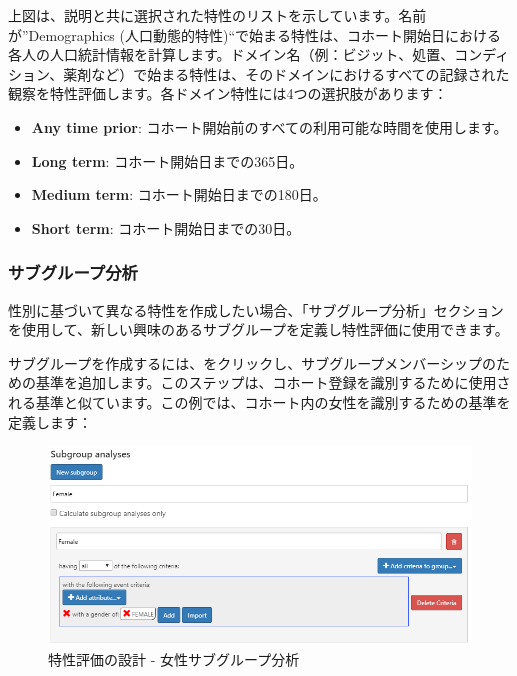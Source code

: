 \documentclass[
  11pt]{book}
\providecommand{\tightlist}{%
  \setlength{\itemsep}{0pt}\setlength{\parskip}{0pt}}
\theoremstyle{definition}
\theoremstyle{definition}
\theoremstyle{definition}
\theoremstyle{definition}
\theoremstyle{remark}
\begin{document}
上図は、説明と共に選択された特性のリストを示しています。名前が''Demographics (人口動態的特性)``で始まる特性は、コホート開始日における各人の人口統計情報を計算します。ドメイン名（例：ビジット、処置、コンディション、薬剤など）で始まる特性は、そのドメインにおけるすべての記録された観察を特性評価します。各ドメイン特性には4つの選択肢があります：

\begin{itemize}
\tightlist
\item
  \textbf{Any time prior}: コホート開始前のすべての利用可能な時間を使用します。
\item
  \textbf{Long term}: コホート開始日までの365日。
\item
  \textbf{Medium term}: コホート開始日までの180日。
\item
  \textbf{Short term}: コホート開始日までの30日。
\end{itemize}

\subsubsection*{サブグループ分析}\label{ux30b5ux30d6ux30b0ux30ebux30fcux30d7ux5206ux6790}

性別に基づいて異なる特性を作成したい場合、「サブグループ分析」セクションを使用して、新しい興味のあるサブグループを定義し特性評価に使用できます。

サブグループを作成するには、をクリックし、サブグループメンバーシップのための基準を追加します。このステップは、コホート登録を識別するために使用される基準と似ています。この例では、コホート内の女性を識別するための基準を定義します：

\begin{figure}

{\centering \includegraphics[width=1\linewidth]{images/Characterization/atlasCharacterizationSubgroup} 

}

\caption{特性評価の設計 - 女性サブグループ分析}\label{fig:atlasCharacterizationSubgroup}
\end{figure}
\end{document}
